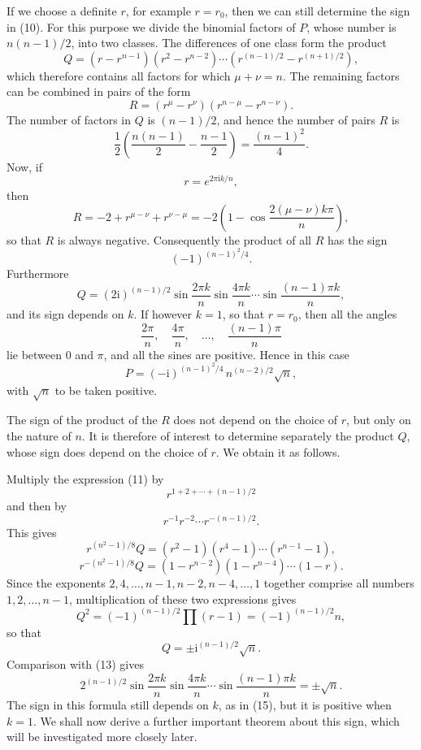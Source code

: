 \documentclass[11pt]{article}
\providecommand{\ii}{\mathrm{i}}
\begin{document}
If we choose a definite $r$, for example $r=r_0$, then we can still determine the sign in (10). For this purpose we divide the binomial factors of $P$, whose number is $n(n-1)/2$, into two classes. The differences of one class form the product
\[
\tag{11}       Q=(r-r^{n-1})(r^2-r^{n-2})\cdots\left(r^{(n-1)/2}-r^{(n+1)/2}\right),
\]
which therefore contains all factors for which $\mu+\nu=n$. The remaining factors can be combined in pairs of the form
\[
\tag{12}       R=(r^\mu-r^\nu)(r^{n-\mu}-r^{n-\nu}).
\]
The number of factors in $Q$ is $(n-1)/2$, and hence the number of pairs $R$ is
\[
        \frac12\left(\frac{n(n-1)}2-\frac{n-1}2\right)=\frac{(n-1)^2}{4}.
\]
Now, if
\[
        r=e^{2\pi \ii k/n},
\]
then
\[
        R=-2+r^{\mu-\nu}+r^{\nu-\mu}
        =-2\left(1-\cos\frac{2(\mu-\nu)k\pi}{n}\right),
\]
so that $R$ is always negative. Consequently the product of all $R$ has the sign
\[
        (-1)^{(n-1)^2/4}.
\]
Furthermore
\[
\tag{13}       Q=(2\ii)^{(n-1)/2}\sin\frac{2\pi k}{n}\sin\frac{4\pi k}{n}\cdots\sin\frac{(n-1)\pi k}{n},
\]
and its sign depends on $k$. If however $k=1$, so that $r=r_0$, then all the angles
\[
        \frac{2\pi}{n},\quad \frac{4\pi}{n},\quad\ldots,\quad \frac{(n-1)\pi}{n}
\]
lie between $0$ and $\pi$, and all the sines are positive. Hence in this case
\[
\tag{14}       P=(-\ii)^{(n-1)^2/4}\, n^{(n-2)/2}\sqrt n,
\]
with $\sqrt n$ to be taken positive.

The sign of the product of the $R$ does not depend on the choice of $r$, but only on the nature of $n$. It is therefore of interest to determine separately the product $Q$, whose sign does depend on the choice of $r$. We obtain it as follows.

Multiply the expression (11) by
\[
        r^{1+2+\cdots+(n-1)/2}
\]
and then by
\[
        r^{-1}r^{-2}\cdots r^{-(n-1)/2}.
\]
This gives
\[
        r^{(n^2-1)/8}Q=(r^2-1)(r^4-1)\cdots(r^{n-1}-1),
\]
\[
        r^{-(n^2-1)/8}Q=(1-r^{n-2})(1-r^{n-4})\cdots(1-r).
\]
Since the exponents $2,4,\ldots,n-1,n-2,n-4,\ldots,1$ together comprise all numbers $1,2,\ldots,n-1$, multiplication of these two expressions gives
\[
        Q^2=(-1)^{(n-1)/2}\prod(r-1)=(-1)^{(n-1)/2}n,
\]
so that
\[
\tag{15}       Q=\pm \ii^{(n-1)/2}\sqrt n.
\]
Comparison with (13) gives
\[
\tag{16}       2^{(n-1)/2}\sin\frac{2\pi k}{n}\sin\frac{4\pi k}{n}\cdots\sin\frac{(n-1)\pi k}{n}=\pm\sqrt n.
\]
The sign in this formula still depends on $k$, as in (15), but it is positive when $k=1$. We shall now derive a further important theorem about this sign, which will be investigated more closely later.
\end{document}
